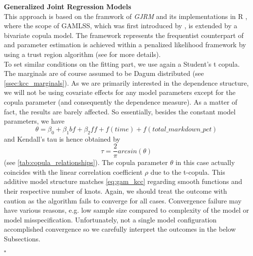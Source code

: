 \textbf{Generalized Joint Regression Models}\\
This approach is based on the framwork of \textit{\ac{GJRM}} and its implementations in R \citep{marra1605bivariate, marragjrm}, where the scope of \ac{GAMLSS}, which was first introduced by \cite{rigby2005generalized}, is extended by a bivariate copula model. The framework represents the frequentist counterpart of \cite{klein2016simultaneous} and parameter estimation is achieved within a penalized likelihood framework by using a trust region algorithm (see \cite{marragjrm} for more details). \\

To set similar conditions on the fitting part, we use again a Student's t copula. The marginals are of course assumed to be Dagum distributed (see \autoref{ssec:kcc_marginals}). As we are primarily interested in the dependence structure, we will not be using covariate effects for any model parameters except for the copula parameter (and consequently the dependence measure). As a matter of fact, the results are barely affected. So essentially, besides the constant model parameters, we have 
\begin{equation}
\theta = \beta_0 + \beta_1 \textit{bf} + \beta_2 \textit{ff} + f(\textit{time}) + f(\textit{total\_markdown\_pct})
\label{eq:gjrm_kcc}
\end{equation}
and Kendall's tau is hence obtained by 
$$
\tau = \frac{2}{\pi}arcsin(\theta)
$$
(see \autoref{tab:copula_relationships}). The copula parameter $\theta$ in this case actually coincides with the linear correlation coefficient $\rho$ due to the t-copula. This additive model structure matches \autoref{eq:gam_kcc} regarding smooth functions and their respective number of knots. Again, we should treat the outcome with caution as the algorithm fails to converge for all cases. Convergence failure may have various reasons, e.g. low sample size compared to complexity of the model or model misspecification. Unfortunately, not a single model configuration accomplished convergence so we carefully interpret the outcomes in the below Subsections.


\hfill $\square$ \\












